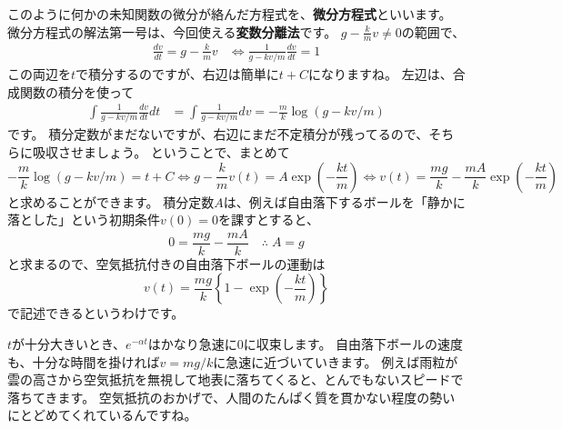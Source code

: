 このように何かの未知関数の微分が絡んだ方程式を、\textbf{微分方程式}といいます。
微分方程式の解法第一号は、今回使える\textbf{変数分離法}です。
$g-\frac{k}{m}v\neq0$の範囲で、
\begin{align*}
  \frac{dv}{dt}=g-\frac{k}{m}v &\iff \frac{1}{g-kv/m}\frac{dv}{dt}=1
\end{align*}
この両辺を$t$で積分するのですが、右辺は簡単に$t+C$になりますね。
左辺は、合成関数の積分を使って
\begin{align*}
  \int \frac{1}{g-kv/m}\frac{dv}{dt}dt &= \int \frac{1}{g-kv/m}dv=-\frac{m}{k}\log(g-kv/m)
\end{align*}
です。
積分定数がまだないですが、右辺にまだ不定積分が残ってるので、そちらに吸収させましょう。
ということで、まとめて
\[
  -\frac{m}{k}\log(g-kv/m)=t+C \iff  g-\frac{k}{m}v(t)=A\exp\left(-\frac{kt}{m}\right) \iff v(t)=\frac{mg}{k}-\frac{mA}{k}\exp\left(-\frac{kt}{m}\right)
\]
と求めることができます。
積分定数$A$は、例えば自由落下するボールを「静かに落とした」という初期条件$v(0)=0$を課すとすると、
\[
  0=\frac{mg}{k}-\frac{mA}{k} \quad \therefore \; A=g
\]
と求まるので、空気抵抗付きの自由落下ボールの運動は
\[
  v(t)=\frac{mg}{k}\left\{1-\exp\left(-\frac{kt}{m}\right)\right\}
\]
で記述できるというわけです。

$t$が十分大きいとき、$e^{-\alpha t}$はかなり急速に0に収束します。
自由落下ボールの速度も、十分な時間を掛ければ$v=mg/k$に急速に近づいていきます。
例えば雨粒が雲の高さから空気抵抗を無視して地表に落ちてくると、とんでもないスピードで落ちてきます。
空気抵抗のおかげで、人間のたんぱく質を貫かない程度の勢いにとどめてくれているんですね。
